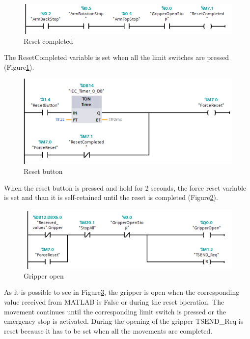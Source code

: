 \begin{figure}[!h]
\begin{center}
\includegraphics[width=0.6\linewidth]{capitolo3/figure/Segmento1_18.PNG}
\caption{Reset completed}
\label{fig:reset_completed}
\end{center}
\end{figure}

The ResetCompleted variable is set when all the limit switches are pressed (Figure\ref{fig:reset_completed}).

\begin{figure}[!h]
\begin{center}
\includegraphics[width=0.6\linewidth]{capitolo3/figure/reset_button.PNG}
\caption{Reset button}
\label{fig:reset_button}
\end{center}
\end{figure}

When the reset button is pressed and hold for 2 seconds, the force reset variable is set and than it is self-retained until the reset is completed (Figure\ref{fig:reset_button}).


\begin{figure}[!h]
\begin{center}
\includegraphics[width=0.6\linewidth]{capitolo3/figure/Segmento1_1_GO.PNG}
\caption{Gripper open}
\label{fig:gripper_open}
\end{center}
\end{figure}

As it is possible  to see in Figure\ref{fig:gripper_open}, the gripper is open when the corresponding value received from MATLAB is False or during the reset operation. The movement continues until the corresponding limit switch is pressed or the emergency stop is activated. During the opening of the gripper TSEND\_Req is reset because it has to be set when all the movements are completed.


